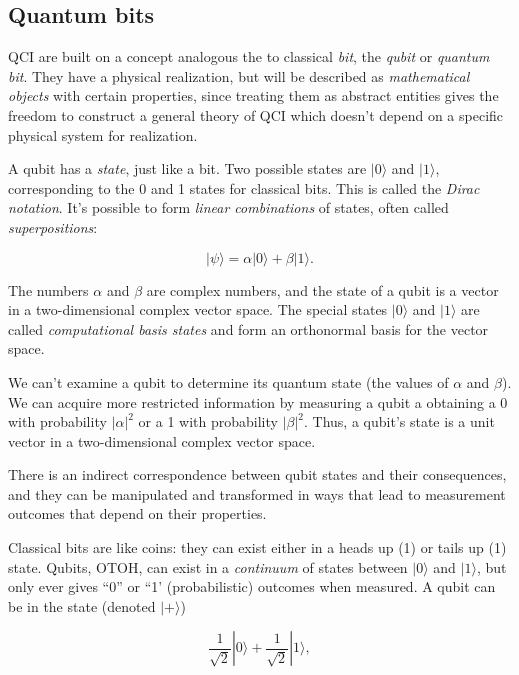 \documentclass{article}
\numberwithin{equation}{section}
\newcommand{\bracket}[1]{|#1\rangle}
\begin{document}
\subsection{Quantum bits}

QCI are built on a concept analogous the to classical \textit{bit}, the \textit{qubit} or \textit{quantum bit}. They have a physical realization, but will be described as \textit{mathematical objects} with certain properties, since treating them as abstract entities gives the freedom to construct a general theory of QCI which doesn't depend on a specific physical system for realization.

A qubit has a \textit{state}, just like a bit. Two possible states are $\bracket{0}$ and $\bracket{1}$, corresponding to the 0 and 1 states for classical bits. This is called the \textit{Dirac notation}. It's possible to form \textit{linear combinations} of states, often called \textit{superpositions}:

\begin{equation} \label{eq:1.1}
\bracket{\psi} = \alpha \bracket{0} + \beta \bracket{1}.
\end{equation}

The numbers $\alpha$ and $\beta$ are complex numbers, and the state of a qubit is a vector in a two-dimensional complex vector space. The special states $\bracket{0}$ and $\bracket{1}$ are called \textit{computational basis states} and form an orthonormal basis for the vector space.

We can't examine a qubit to determine its quantum state (the values of $\alpha$ and $\beta$). We can acquire more restricted information by measuring a qubit a obtaining a 0 with probability $|\alpha|^2$ or a 1 with probability $|\beta|^2$. Thus, a qubit's state is a unit vector in a two-dimensional complex vector space.

There is an indirect correspondence between qubit states and their consequences, and they can be manipulated and transformed in ways that lead to measurement outcomes that depend on their properties.

Classical bits are like coins: they can exist either in a heads up (1) or tails up (1) state. Qubits, OTOH, can exist in a \textit{continuum} of states between $\bracket{0}$ and $\bracket{1}$, but only ever gives ``0'' or ``1' (probabilistic) outcomes when measured. A qubit can be in the state (denoted $\bracket{+}$)

\begin{equation} \label{eq:1.2}
\frac{1}{\sqrt{2}} \bracket{0} + \frac{1}{\sqrt{2}} \bracket{1},
\end{equation}
\end{document}
